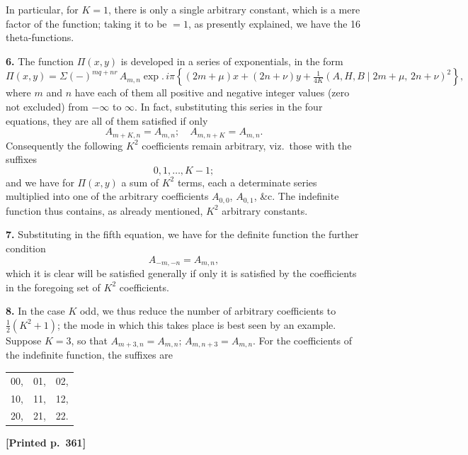 \documentclass[11pt]{article}
\begin{document}
In particular, for $K=1$, there is only a single arbitrary constant, which is a mere factor of the function; taking it to be $=1$, as presently explained, we have the 16 theta-functions.

\medskip
\noindent\textbf{6.} The function $\Pi(x,y)$ is developed in a series of exponentials, in the form
\[
\Pi(x,y) = \Sigma(-)^{mq+nr}\,A_{m,n}\exp.\,i\pi\left\{(2m+\mu)x+(2n+\nu)y+\tfrac{1}{4K}(A,H,B \mid 2m+\mu,\,2n+\nu)^{2}\right\},
\]
where $m$ and $n$ have each of them all positive and negative integer values (zero not excluded) from $-\infty$ to $\infty$. In fact, substituting this series in the four equations, they are all of them satisfied if only
\[
A_{m+K,n}=A_{m,n};\quad A_{m,n+K}=A_{m,n}.
\]
Consequently the following $K^{2}$ coefficients remain arbitrary, viz.\ those with the suffixes
\[
0,1,\ldots,K-1;
\]
and we have for $\Pi(x,y)$ a sum of $K^{2}$ terms, each a determinate series multiplied into one of the arbitrary coefficients $A_{0,0}$, $A_{0,1}$, \&c.  The indefinite function thus contains, as already mentioned, $K^{2}$ arbitrary constants.

\medskip
\noindent\textbf{7.} Substituting in the fifth equation, we have for the definite function the further condition
\[
A_{-m,-n}=A_{m,n},
\]
which it is clear will be satisfied generally if only it is satisfied by the coefficients in the foregoing set of $K^{2}$ coefficients.

\medskip
\noindent\textbf{8.} In the case $K$ odd, we thus reduce the number of arbitrary coefficients to $\tfrac{1}{2}(K^{2}+1)$; the mode in which this takes place is best seen by an example. Suppose $K=3$, so that $A_{m+3,n}=A_{m,n}$; $A_{m,n+3}=A_{m,n}$.  For the coefficients of the indefinite function, the suffixes are
\begin{center}
\begin{tabular}{ccc}
00, & 01, & 02,\\
10, & 11, & 12,\\
20, & 21, & 22.
\end{tabular}
\end{center}

\medskip
\noindent\textbf{[Printed p.~361]}\hfill
\end{document}
